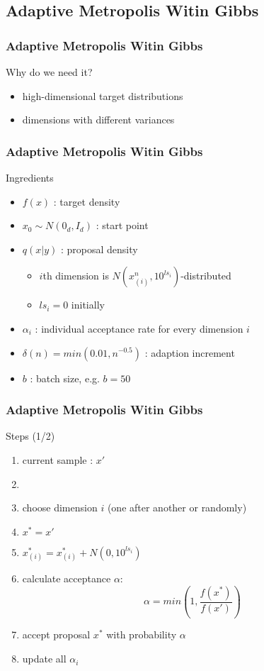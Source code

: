
\subsection{Adaptive Metropolis Witin Gibbs}
\begin{frame}
\frametitle{Adaptive Metropolis Witin Gibbs}
\begin{block}{Why do we need it?}
\begin{itemize}
\item high-dimensional target distributions
\item dimensions with different variances
\end{itemize}
\end{block}

\end{frame}


\begin{frame}
\frametitle{Adaptive Metropolis Witin Gibbs}

\begin{block}{Ingredients}
\begin{itemize}
\item $f(x)$ : target density
\item $x_0 \sim N(0_d, I_d)$ : start point
\item $q(x|y)$ : proposal density
\begin{itemize}
  \item $i$th dimension is $ N(x_{(i)}^n, 10^{ls_i})$-distributed
  \item $ls_i = 0$ initially
\end{itemize}
 \item $\alpha_i$ : individual acceptance rate for every dimension $i$
\item $\delta(n) = min(0.01, n^{-0.5})$ : adaption increment
\item $b$ : batch size, e.g. $b=50$
\end{itemize}
\end{block}

\end{frame}




\begin{frame}
\frametitle{Adaptive Metropolis Witin Gibbs}

\begin{block}{Steps (1/2)}
\begin{enumerate}
  \item current sample : $x'$
  \item[]
\item choose dimension $i$ (one after another or randomly)
\item $x^* = x'$
\item $x^*_{(i)} = x^*_{(i)} + N(0, 10^{ls_i})$
\item calculate acceptance $\alpha$:
\[\alpha = min\left(1, \frac{f(x^*)}{f(x')} \right)\]

\item accept proposal $x^*$ with probability $\alpha$
\item update all $\alpha_i$
\end{enumerate}
\end{block}
\end{frame}

